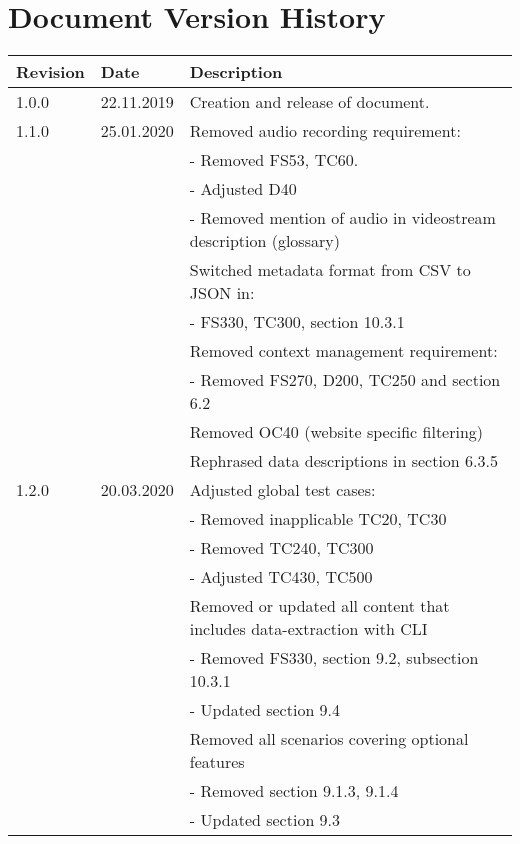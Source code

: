 \chapter*{Document Version History}
\label{ch:versionhistory}
\begin{table}[h]
\begin{tabular}{lll}
\textbf{Revision} & \textbf{Date} & \textbf{Description}              \\
\hline
1.0.0             & 22.11.2019    & Creation and release of document. \\
\hline
1.1.0             & 25.01.2020    & Removed audio recording requirement: \\
&& - Removed FS53, TC60. \\
&& - Adjusted D40 \\
&& - Removed mention of audio in \gls{videostream} description (glossary) \\
&& Switched metadata format from CSV to JSON in:\\
&& - FS330, TC300, section 10.3.1 \\
&& Removed context management requirement:\\
&& - Removed FS270, D200, TC250 and section 6.2\\
&& Removed OC40 (website specific filtering)\\
&& Rephrased data descriptions in section 6.3.5\\
\hline
1.2.0           & 20.03.2020    & Adjusted global test cases: \\
&& - Removed inapplicable TC20, TC30\\
&& - Removed TC240, TC300\\
&& - Adjusted TC430, TC500\\
&& Removed or updated all content that includes data-extraction with CLI\\
&& - Removed FS330, section 9.2, subsection 10.3.1\\
&& - Updated section 9.4\\
&& Removed all scenarios covering optional features\\
&& - Removed section 9.1.3, 9.1.4\\
&& - Updated section 9.3\\
\end{tabular}
\end{table}